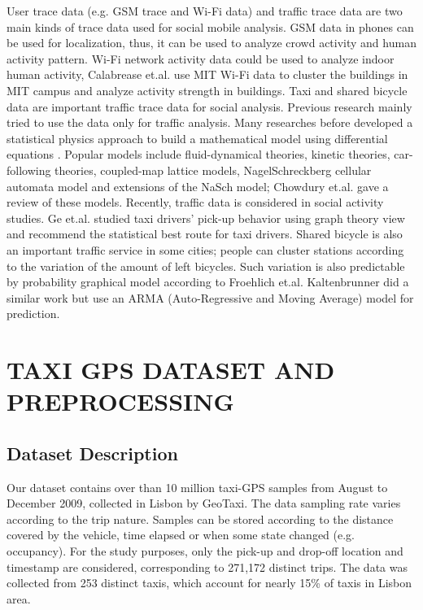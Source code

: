 \documentclass[a4paper, 10pt, conference]{ieeeconf}      %
\begin{document}
User trace data (e.g. GSM trace and Wi-Fi data) and traffic trace data are two main kinds of trace data used for social mobile analysis. GSM data in phones can be used for localization, thus, it can be used to analyze crowd activity and human activity pattern. Wi-Fi network activity data could be used to analyze indoor human activity, Calabrease et.al.  use MIT Wi-Fi data to cluster the buildings in MIT campus and analyze activity strength in buildings.
Taxi and shared bicycle data are important traffic trace data for social analysis. Previous research mainly tried to use the data only for traffic analysis. Many researches before developed a statistical physics approach to build a mathematical model using differential equations . Popular models include fluid-dynamical theories, kinetic theories, car-following theories, coupled-map lattice models, NagelSchreckberg cellular automata model and extensions of the NaSch model; Chowdury et.al.  gave a review of these models.
Recently, traffic data is considered in social activity studies. Ge et.al.  studied taxi drivers’ pick-up behavior using graph theory view and recommend the statistical best route for taxi drivers. Shared bicycle is also an important traffic service in some cities; people can cluster stations according to the variation of the amount of left bicycles. Such variation is also predictable by probability graphical model according to Froehlich et.al.  Kaltenbrunner  did a similar work but use an ARMA (Auto-Regressive and Moving Average) model for prediction.

\section{TAXI GPS DATASET AND PREPROCESSING}%

\subsection{Dataset Description} 

Our dataset contains over than 10 million taxi-GPS samples from August to December 2009, collected in Lisbon by GeoTaxi. The data sampling rate varies according to the trip nature. Samples can be stored according to the distance covered by the vehicle, time elapsed or when some state changed (e.g. occupancy). For the study purposes, only the pick-up and drop-off location and timestamp are considered, corresponding to 271,172 distinct trips. The data was collected from 253 distinct taxis, which account for nearly 15\% of taxis in Lisbon area. 
\end{document}
